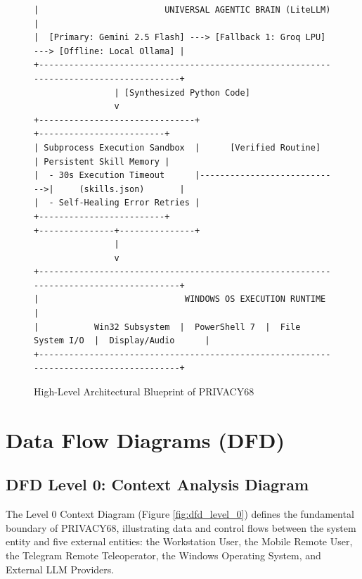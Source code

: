 \begin{figure}[htbp]
{\begin{verbatim}
|                         UNIVERSAL AGENTIC BRAIN (LiteLLM)                             |
|  [Primary: Gemini 2.5 Flash] ---> [Fallback 1: Groq LPU] ---> [Offline: Local Ollama] |
+---------------------------------------------------------------------------------------+
                | [Synthesized Python Code]
                v
+-------------------------------+                             +-------------------------+
| Subprocess Execution Sandbox  |      [Verified Routine]     | Persistent Skill Memory |
|  - 30s Execution Timeout      |---------------------------->|     (skills.json)       |
|  - Self-Healing Error Retries |                             +-------------------------+
+---------------+---------------+
                |
                v
+---------------------------------------------------------------------------------------+
|                             WINDOWS OS EXECUTION RUNTIME                              |
|           Win32 Subsystem  |  PowerShell 7  |  File System I/O  |  Display/Audio      |
+---------------------------------------------------------------------------------------+
\end{verbatim}
}
\caption{High-Level Architectural Blueprint of PRIVACY68}
\label{fig:high_level_architecture}
\end{figure}

\section{Data Flow Diagrams (DFD)}

\subsection{DFD Level 0: Context Analysis Diagram}
The Level 0 Context Diagram (Figure \ref{fig:dfd_level_0}) defines the fundamental boundary of PRIVACY68, illustrating data and control flows between the system entity and five external entities: the Workstation User, the Mobile Remote User, the Telegram Remote Teleoperator, the Windows Operating System, and External LLM Providers.

